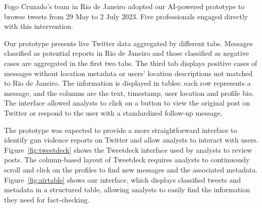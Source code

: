 \documentclass[11pt,letterpaper]{article}
\begin{document}
Fogo Cruzado's team in Rio de Janeiro adopted our AI-powered prototype to browse tweets from 29 May to 2 July 2023. Five professionals engaged directly with this intervention. 

Our prototype presents live Twitter data aggregated by different tabs. Messages classified as potential reports in Rio de Janeiro and those classified as negative cases are aggregated in the first two tabs. The third tab displays positive cases of messages without location metadata or users' location descriptions not matched to Rio de Janeiro. The information is displayed in tables: each row represents a message, and the columns are the text, timestamp, user location and profile bio. The interface allowed analysts to click on a button to view the original post on Twitter or respond to the user with a standardized follow-up message. 

The prototype was expected to provide a more straightforward interface to identify gun violence reports on Twitter and allow analysts to interact with users. Figure~\ref{fig:tweetdeck} shows the Tweetdeck interface used by analysts to review posts. The column-based layout of Tweetdeck requires analysts to continuously scroll and click on the profiles to find new messages and the associated metadata. Figure~\ref{fig:airtable} shows our interface, which displays classified tweets and metadata in a structured table, allowing analysts to easily find the information they need for fact-checking.
\end{document}
